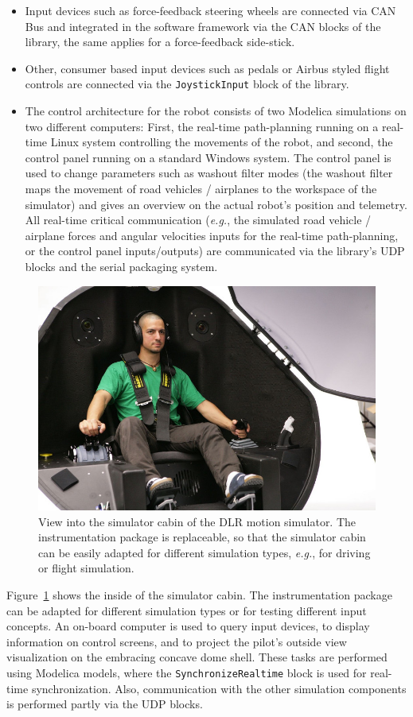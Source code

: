 \documentclass{resources/modelica}
\newcommand{\modelica}[1]{\lstinline[language=modelica]|#1|}
\begin{document}
\begin{itemize}
  \item Input devices such as force-feedback steering wheels are connected via CAN Bus
and integrated in the software framework via the CAN blocks of the library, the same
applies for a force-feedback side-stick.
  \item Other, consumer based input devices such as pedals or Airbus styled flight
controls are connected via the \modelica{JoystickInput} block of the library.
  \item The control architecture for the robot consists of two Modelica simulations on
two different computers: First, the real-time path-planning running on a
real-time Linux system controlling the movements of the robot, and second, the
control panel running on a standard Windows system. The control panel is used to
change parameters such as washout filter modes (the washout filter maps the
movement of road vehicles / airplanes to the workspace of the simulator) and
gives an overview on the actual robot's position and telemetry. All real-time critical
communication (\textit{e.g.}, the simulated road vehicle / airplane forces and
angular velocities inputs for the real-time path-planning, or the control panel
inputs/outputs) are communicated via the library's UDP blocks and the serial
packaging system.
\end{itemize}

\begin{figure}[htb]
  \centering \includegraphics[width=0.9\columnwidth]{figures/DLRSimulatorCabin}
  \caption{View into the simulator cabin of the DLR motion simulator. The
  instrumentation package is replaceable, so that the simulator cabin can be
  easily adapted for different simulation types, \textit{e.g.}, for driving or
  flight simulation.}
  \label{fig:DLRSimulatorCabin}
\end{figure}
Figure~\ref{fig:DLRSimulatorCabin} shows the inside of the simulator cabin.
The instrumentation package can be adapted
for different simulation types or for testing different input concepts.
An on-board computer is used to query input devices, to display information on
control screens, and to project the pilot's outside view visualization on the
embracing concave dome shell. These
tasks are performed using Modelica models, where the
\modelica{SynchronizeRealtime} block is used for real-time
synchronization. Also, communication with the other simulation components is
performed partly via the UDP blocks.
\end{document}
